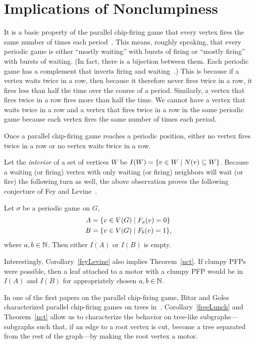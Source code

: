 \section{Implications of Nonclumpiness} \label{corollaries}
It is a basic property of the parallel chip-firing game that every vertex fires
the same number of times each period~\cite{jiang}. This means, roughly
speaking, that every periodic game is either ``mostly waiting'' with bursts of
firing or ``mostly firing'' with bursts of waiting. (In fact, there is a
bijection between them. Each periodic game has a complement that inverts firing
and waiting~\cite{jiang}.) This is because if a vertex waits twice in a row,
then because it therefore never fires twice in a row, it fires less than half
the time over the course of a period. Similarly, a vertex that fires twice in a
row fires more than half the time. We cannot have a vertex that waits twice
in a row and a vertex that fires twice in a row in the same periodic game
because each vertex fires the same number of times each period.

\begin{cor}
Once a parallel chip-firing game reaches a periodic position, either no vertex
fires twice in a row or no vertex waits twice in a row.
\end{cor}

Let the \emph{interior} of a set of vertices $W$ be $I(W) = \set{v \in W}{N(v)
  \subseteq W}$. Because a waiting (or firing) vertex with only waiting (or
firing) neighbors will wait (or fire) the following turn as well, the above
observation proves the following conjecture of Fey and
Levine~\cite{privateComms}.

\begin{cor}\label{feyLevine}
Let $\sigma$ be a periodic game on $G$,
\begin{align*}
  A &= \set{v \in \V}{\firing{v}{a} = 0} \\
  B &= \set{v \in \V}{\firing{v}{b} = 1},
\end{align*}
where $a,b \in \mathbb{N}$. Then either $I(A)$ or $I(B)$ is empty.
\end{cor}

Interestingly, Corollary~\ref{feyLevine} also implies Theorem~\ref{nct}. If clumpy
PFPs were possible, then a leaf attached to a motor with a clumpy PFP would be
in $I(A)$ and $I(B)$ for appropriately chosen $a,b \in \mathbb{N}$.

In one of the first papers on the parallel chip-firing game, Bitar and Goles
characterized parallel chip-firing games on trees in~\cite{bitarGoles}.
Corollary~\ref{freeLunch} and Theorem~\ref{nct} allow us to characterize the
behavior on tree-like subgraphs---subgraphs such that, if an edge to a root
vertex is cut, become a tree separated from the rest of the graph---by making
the root vertex a motor.

